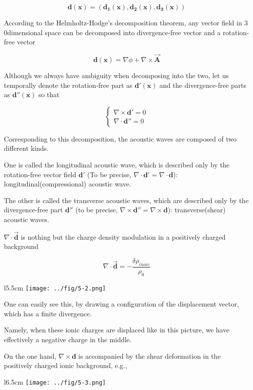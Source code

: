\[\bm{d(x) = (d_1(x),d_2(x),d_3(x))} \]

According to the Helmholtz-Hodge's decomposition theorem, any vector field in $3$0dimensional space can be decomposed into divergence-free vector and a rotation-free vector

\[\bm{d(x)} = \nabla\phi + \nabla\times\vec{\bm{A}} \]

Although we always have ambiguity when decomposing into the two, let us temporally denote the rotation-free part as $\bm{d'(x)}$ and the divergence-free parts as $\bm{d''(x)}$ so that

\[\begin{cases}
\nabla\times\bm{d'} = 0\\
\nabla\cdot\bm{d''} = 0
\end{cases}\]

Corresponding to this decomposition, the acoustic waves are composed of two different kinds.

One is called the longitudinal acoustic wave, which is described only by the rotation-free vector field $\bm{d'}$ (To be precise, $\nabla\cdot \bm{d'} = \nabla\cdot\bm{d}$): longitudinal(compressional) acoustic wave.

The other is called the transverse acoustic waves, which are described only by the divergence-free part $\bm{d''}$ (to be precise, $\nabla\times\bm{d''} = \nabla\times\bm{d}$): transverse(shear) acoustic waves.

$\nabla\cdot \vec{\bm{d}}$ is nothing but the charge density modulation in a positively charged background

\[\nabla\cdot\vec{\bm{d}} = -\frac{\delta\rho_{inoic}}{\rho_0}\]

\begin{wrapfigure}{l}{5.5cm}
\texttt{[image: ../fig/5-2.png]}
\end{wrapfigure}
One can easily see this, by drawing a configuration of the displacement vector, which has a finite divergence.

Namely, when these ionic charges are displaced like in this picture, we have effectively a negative charge in the middle.

On the one hand, $\nabla\times\bm{d}$ is accompanied by the shear deformation in the positively charged ionic background, e.g.,

\begin{figure}
\end{figure}
\begin{wrapfigure}{l}{6.5cm}
\texttt{[image: ../fig/5-3.png]}
\end{wrapfigure}

